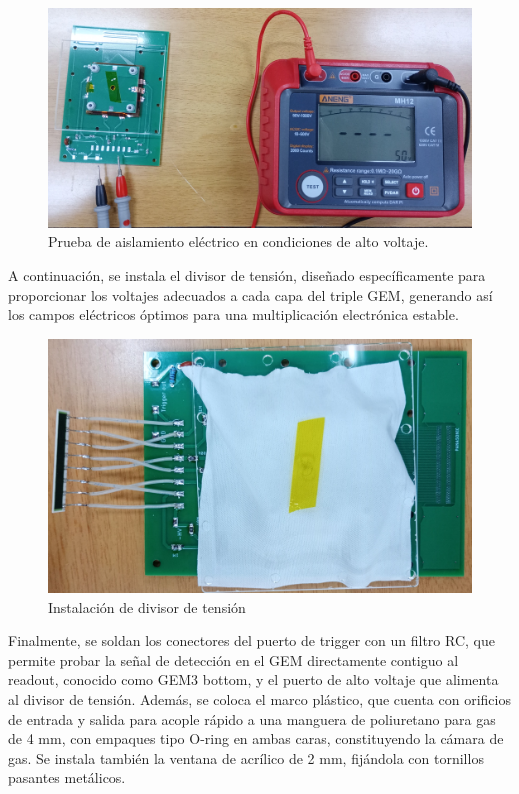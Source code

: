 \documentclass{article}
\begin{document}
\begin{figure}[H]
    \centering
    \includegraphics[width=1\textwidth]{insulation_test.jpg}
    \caption{Prueba de aislamiento eléctrico en condiciones de alto voltaje.}
    \label{fig:ins_test}
\end{figure}

\noindent A continuación, se instala el divisor de tensión, diseñado específicamente para proporcionar los voltajes adecuados a cada capa del triple GEM, generando así los campos eléctricos óptimos para una multiplicación electrónica estable.

\begin{figure}[H]
    \centering
    \includegraphics[width=1\textwidth]{divider.jpg}
    \caption{Instalación de divisor de tensión}
    \label{fig:divider}
\end{figure}

\noindent Finalmente, se soldan los conectores del puerto de trigger con un filtro RC, que permite probar la señal de detección en el GEM directamente contiguo al readout, conocido como GEM3 bottom, y el puerto de alto voltaje que alimenta al divisor de tensión. Además, se coloca el marco plástico, que cuenta con orificios de entrada y salida para acople rápido a una manguera de poliuretano para gas de 4 mm, con empaques tipo O-ring en ambas caras, constituyendo la cámara de gas. Se instala también la ventana de acrílico de 2 mm, fijándola con tornillos pasantes metálicos.
\end{document}
